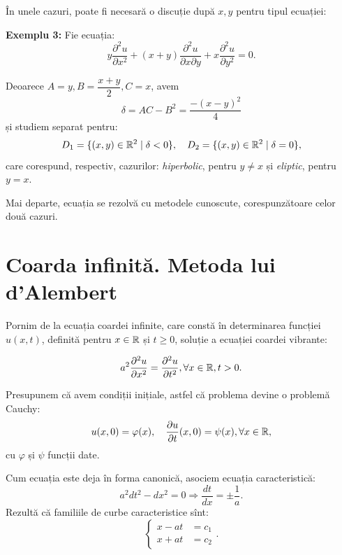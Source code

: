 \vspace{1cm}

În unele cazuri, poate fi necesară o discuție după $ x, y $ pentru tipul ecuației:

\textbf{Exemplu 3:} Fie ecuația:
\[
  y \dfrac{\partial^2 u}{\partial x^2} + (x + y) \dfrac{\partial^2 u}{\partial x\partial y} + %
  x \dfrac{\partial^2 u}{\partial y^2} = 0.
\]

Deoarece $ A = y, B = \dfrac{x + y}{2}, C = x $, avem
\[
  \delta = AC - B^2 = \dfrac{-(x - y)^2}{4}
\]
și studiem separat pentru:
\[
  D_1 = \{(x, y) \in \RR^2 \mid \delta < 0 \}, \quad %
  D_2 = \{(x, y) \in \RR^2 \mid \delta = 0 \},
\]
care corespund, respectiv, cazurilor: \emph{hiperbolic}, pentru $ y \neq x $ și
\emph{eliptic}, pentru $ y = x $.

Mai departe, ecuația se rezolvă cu metodele cunoscute, corespunzătoare celor
două cazuri.




\section{Coarda infinită. Metoda lui d'Alembert}

\indent\indent Pornim de la ecuația coardei infinite, care constă în determinarea funcției
$ u(x, t) $, definită pentru $ x \in \mathbb{R} $ și $ t \geq 0 $, soluție a ecuației
coardei vibrante:

\[
  a^2 \dfrac{\partial^2 u}{\partial x^2} = \dfrac{\partial^2 u}{\partial t^2}, %
  \forall x \in \RR, t > 0.
\]

Presupunem că avem condiții inițiale, astfel că problema devine o problemă Cauchy:
\[
  u(x, 0) = \varphi(x), \quad \dfrac{\partial u}{\partial t}(x, 0) = \psi(x), \forall x \in \mathbb{R},
\]
cu $ \varphi $ și $ \psi $ funcții date.

Cum ecuația este deja în forma canonică, asociem ecuația caracteristică:
\[
  a^2 dt^2 - dx^2 = 0 \Rightarrow \dfrac{dt}{dx} = \pm\dfrac{1}{a}.
\]
Rezultă că familiile de curbe caracteristice sînt:
\[
  \begin{cases}
    x - at &= c_1 \\
    x + at &= c_2
  \end{cases}.
\]

